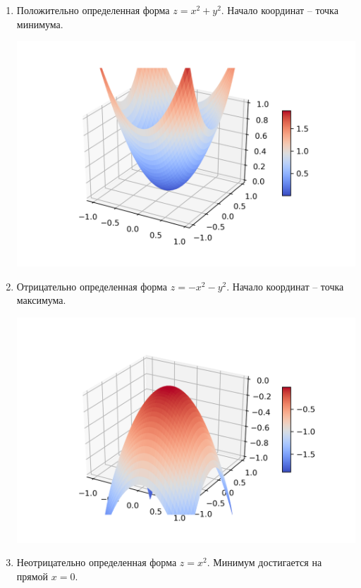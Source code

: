 \begin{enumerate}
\item Положительно определенная форма $z = x^2 + y^2$.
Начало координат -- точка минимума.

\includegraphics[scale = 0.5]{Figures/graph_positive.png}

\item Отрицательно определенная форма $z = - x^2 - y^2$.
Начало координат -- точка максимума.

\includegraphics[scale = 0.5]{Figures/graph_negative.png}

\item Неотрицательно определенная форма $z = x^2$.
Минимум достигается на прямой $ x = 0$.


\end{enumerate}
